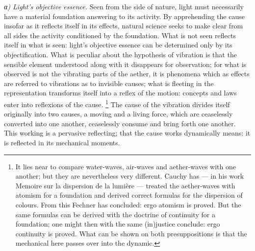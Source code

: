 \documentclass[12pt,a4paper]{book}
\newcommand{\subrunin}[1]{\emph{#1}\hspace{0.4em}}
\begin{document}
\subrunin{α) Light's objective essence.} Seen from the side of nature, light must necessarily have a material
foundation answering to its activity. By apprehending the cause insofar as it reflects itself in its effects, natural
science seeks to make clear from all sides the activity conditioned by the foundation. What is not seen reflects itself
in what is seen: light's objective essence can be determined only by its objectification. What is peculiar about the
hypothesis of vibration
is that the sensible element understood along with it disappears for observation; for what is observed is not the
vibrating parts of the aether, it is phenomena which as effects are referred to vibrations as to invisible causes;
what is fleeting in the representation transforms itself into a reflex of the motion: concepts and laws enter into
reflexions of
the cause.%
\footnote{%
It lies near to compare water-waves, air-waves and aether-waves with one another; but they are nevertheless very
different. Cauchy has --- in his work Memoire sur la dispersion de la lumière --- treated the aether-waves with
atomism for a foundation and derived correct formulas for the dispersion of colours. From this Fechner has concluded:
ergo atomism is
proved. But the same formulas can be derived with the doctrine of continuity for a foundation; one might then with
the same (in)justice conclude: ergo continuity is proved. What can be shown on both presuppositions is that the
mechanical here passes over into the dynamic.
}
The cause of the vibration divides itself originally into two causes, a moving and a living force, which are ceaselessly
converted into one another, ceaselessly consume and bring forth one another. This working is a pervasive reflecting;
that the cause works dynamically means: it is reflected in its mechanical moments.%
\end{document}
